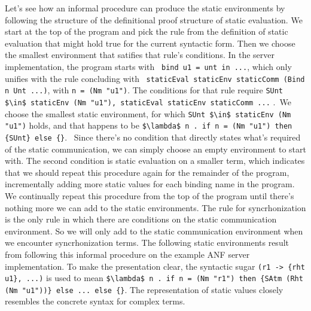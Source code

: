 \documentclass[letterpaper, 11pt]{extarticle}
\begin{document}
Let's see how an informal procedure can produce the static environments by following the
structure of the definitional proof structure of static evaluation.
We start at the top of the program and pick the 
rule from the definition of static evaluation that might hold true for the current syntactic form.
Then we choose the smallest environment that satifies that rule's conditions. 
In the server implementation, the program starts with \
\lstinline[language=normal_lang, mathescape]{bind u1 = unt in ...}, which only unifies with 
the rule concluding with \
\lstinline[language=logic, mathescape]{staticEval staticEnv staticComm (Bind n Unt ...)},
with \lstinline[language=logic, mathescape]{n = (Nm "u1")}. 
The conditions for that rule require 
\lstinline[language=logic, mathescape]{SUnt $\in$ staticEnv (Nm "u1"), staticEval staticEnv staticComm ...} .\
We choose the smallest static environment, for which
\lstinline[language=logic]{SUnt $\in$ staticEnv (Nm "u1")} holds, and that happens to be 
\lstinline[language=logic]|$\lambda$ n . if n = (Nm "u1") then {SUnt} else {}|. \
Since there's no condition that directly states what's required of the static communication, we can
simply choose an empty environment to start with. The second condition is static evaluation on
a smaller term, which indicates that we should repeat this procedure again for the remainder of
the program, incrementally adding more static values for each binding name in the program.
We continually repeat this procedure from the top of the program until there's
nothing more we can add to the static environments.
The rule for syncrhonization is the only rule in which there are conditions on
the static communication environment. So we will only add to the static communication
environment when we encounter syncrhonization terms.
The following static environments result from following this informal procedure on
the example ANF server implementation.
To make the presentation clear, the syntactic sugar \lstinline|(r1 -> {rht u1}, ...)| is used 
to mean \lstinline[language=logic]|$\lambda$ n . if n = (Nm "r1") then {SAtm (Rht (Nm "u1"))} else ... else {}|.
The representation of static values closely resembles the concrete syntax for complex terms.
\end{document}
